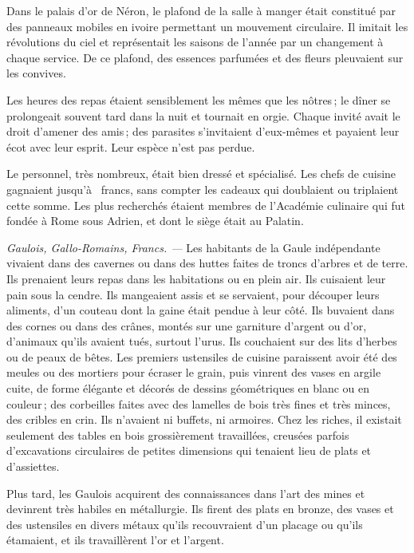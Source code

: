 Dans le palais d'or de Néron, le plafond de la salle à manger était constitué
par des panneaux mobiles en ivoire permettant un mouvement circulaire. Il
imitait les révolutions du ciel et représentait les saisons de l’année par un
changement à chaque service. De ce plafond, des essences parfumées et des
fleurs pleuvaient sur les convives.

Les heures des repas étaient sensiblement les mêmes que les nôtres ; le dîner
se prolongeait souvent tard dans la nuit et tournait en orgie. Chaque invité
avait le droit d'amener des amis ; des parasites s'invitaient d'eux-mêmes et
payaient leur écot avec leur esprit. Leur espèce n'est pas perdue.

Le personnel, très nombreux, était bien dressé et spécialisé. Les chefs de
cuisine gagnaient jusqu'à {\mmm} {\mmm} francs, sans compter les
cadeaux qui doublaient ou triplaient cette somme. Les plus recherchés étaient
membres de l’Académie culinaire qui fut fondée à Rome sous Adrien, et dont le
siège était au Palatin.

\sk

\textit{Gaulois, Gallo-Romains, Francs. —} Les habitants de la Gaule
indépendante vivaient dans des cavernes ou dans des huttes faites de troncs
d'arbres et de terre. Ils prenaient leurs repas dans les habitations ou en
plein air. Ils cuisaient leur pain sous la cendre. Ils mangeaient assis et se
servaient, pour découper leurs aliments, d'un couteau dont la gaine était
pendue à leur côté. Ils buvaient dans des cornes ou dans des crânes, montés
sur une garniture d'argent ou d'or, d'animaux qu'ils avaient tués, surtout
l'urus. Ils couchaient sur des lits d'herbes ou de peaux de bêtes. Les premiers
ustensiles de cuisine paraissent avoir été des meules ou des mortiers pour
écraser le grain, puis vinrent des vases en argile cuite, de forme élégante et
décorés de dessins géométriques en blanc ou en couleur ; des corbeilles faites
avec des lamelles de bois très fines et très minces, des cribles en crin. Ils
n'avaient ni buffets, ni armoires. Chez les riches, il existait seulement des
tables en bois grossièrement travaillées, creusées parfois d'excavations
circulaires de petites dimensions qui tenaient lieu de plats et d'assiettes.

Plus tard, les Gaulois acquirent des connaissances dans l'art des mines et
devinrent très habiles en métallurgie. Ils firent des plats en bronze, des
vases et des ustensiles en divers métaux qu'ils recouvraient d'un placage ou
qu'ils étamaient, et ils travaillèrent l'or et l'argent.

